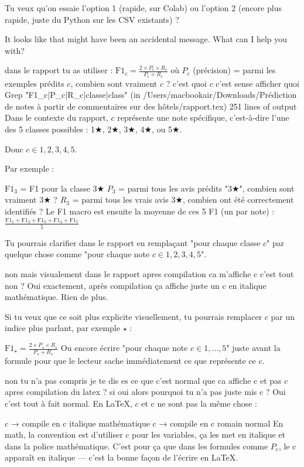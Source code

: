 Tu veux qu'on essaie l'option 1 (rapide, sur Colab) ou l'option 2 (encore plus rapide, juste du Python sur les CSV existants) ?


It looks like that might have been an accidental message. What can I help you with?

dans le rapport tu as utiliser :  $\text{F1}_c = \frac{2 \times P_c \times R_c}{P_c + R_c}$
    où $P_c$ (précision) = parmi les exemples prédits $c$, combien sont vraiment $c$ ? c'est quoi $c$ c'est sense afficher quoi
Grep "F1_c|P_c|R_c|classe|class" (in /Users/macbookair/Downloads/Prédiction de notes à partir de commentaires sur des hôtels/rapport.tex)
251 lines of output
Dans le contexte du rapport, $c$ représente une note spécifique, c'est-à-dire l'une des 5 classes possibles : 1★, 2★, 3★, 4★, ou 5★.

Donc $c \in {1, 2, 3, 4, 5}$.

Par exemple :

$\text{F1}_3$ = F1 pour la classe 3★
$P_3$ = parmi tous les avis prédits "3★", combien sont vraiment 3★ ?
$R_3$ = parmi tous les vrais avis 3★, combien ont été correctement identifiés ?
Le F1 macro est ensuite la moyenne de ces 5 F1 (un par note) : $\frac{\text{F1}_1 + \text{F1}_2 + \text{F1}_3 + \text{F1}_4 + \text{F1}_5}{5}$

Tu pourrais clarifier dans le rapport en remplaçant "pour chaque classe $c$" par quelque chose comme "pour chaque note $c \in {1, 2, 3, 4, 5}$".

non mais visualement dans le rapport apres compilation ca m'affiche c c'est tout non ?
Oui exactement, après compilation ça affiche juste un c en italique mathématique. Rien de plus.

Si tu veux que ce soit plus explicite visuellement, tu pourrais remplacer $c$ par un indice plus parlant, par exemple $\star$ :


$\text{F1}_\star = \frac{2 \times P_\star \times R_\star}{P_\star + R_\star}$
Ou encore écrire "pour chaque note $c \in {1,\ldots,5}$" juste avant la formule pour que le lecteur sache immédiatement ce que représente ce c.

non tu n'a pas compris je te dis es ce que c'est normal que ca affiche c et pas $c$ apres compilation du latex ? si oui alors pourquoi tu n'a pas juste mis c ?
Oui c'est tout à fait normal. En LaTeX, $c$ et c ne sont pas la même chose :

$c$ → compile en c italique mathématique
c → compile en c romain normal
En math, la convention est d'utiliser $c$ pour les variables, ça les met en italique et dans la police mathématique. C'est pour ça que dans les formules comme $P_c$, le c apparaît en italique — c'est la bonne façon de l'écrire en LaTeX.

